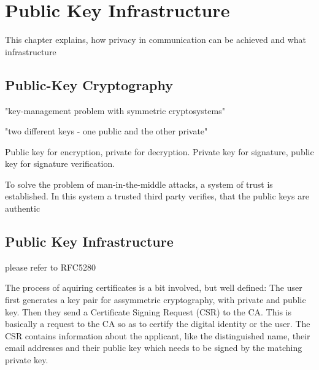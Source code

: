 \chapter{Public Key Infrastructure}\label{ch:publicKeyInfrastructure}

This chapter explains, how privacy in communication can be achieved and what infrastructure

\section{Public-Key Cryptography}\label{sec:publicKeyCryptography}

"key-management problem with symmetric cryptosystems"

"two different keys - one public and the other private"~\cite{schneier2007applied, diffie1976new}

Public key for encryption, private for decryption.
Private key for signature, public key for signature verification.

To solve the problem of man-in-the-middle attacks, a system of trust is established.
In this system a trusted third party verifies, that the public keys are authentic

\section{Public Key Infrastructure}\label{sec:publicKeyInfrastructure}
please refer to RFC5280~\cite{RFC5280}

The process of aquiring certificates is a bit involved, but well defined:
The user first generates a key pair for assymmetric cryptography, with private and public key.
Then they send a Certificate Signing Request (CSR) to the CA.
This is basically a request  to the CA so as to certify the digital identity or the user.
The CSR contains information about the applicant, like the distinguished name, their email addresses and their public
key which needs to be signed by the matching private key.


